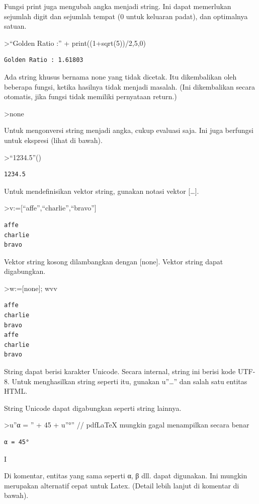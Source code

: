 \documentclass[
]{book}
\begin{document}
Fungsi print juga mengubah angka menjadi string. Ini dapat memerlukan sejumlah digit dan sejumlah tempat (0 untuk keluaran padat), dan optimalnya satuan.

\textgreater{}``Golden Ratio :'' + print((1+sqrt(5))/2,5,0)

\begin{verbatim}
Golden Ratio : 1.61803
\end{verbatim}

Ada string khusus bernama none yang tidak dicetak. Itu dikembalikan oleh beberapa fungsi, ketika hasilnya tidak menjadi masalah. (Ini dikembalikan secara otomatis, jika fungsi tidak memiliki pernyataan return.)

\textgreater none

Untuk mengonversi string menjadi angka, cukup evaluasi saja. Ini juga berfungsi untuk ekspresi (lihat di bawah).

\textgreater{}``1234.5''()

\begin{verbatim}
1234.5
\end{verbatim}

Untuk mendefinisikan vektor string, gunakan notasi vektor {[}\ldots{]}.

\textgreater v:={[}``affe'',``charlie'',``bravo''{]}

\begin{verbatim}
affe
charlie
bravo
\end{verbatim}

Vektor string kosong dilambangkan dengan {[}none{]}. Vektor string dapat digabungkan.

\textgreater w:={[}none{]}; w\textbar v\textbar v

\begin{verbatim}
affe
charlie
bravo
affe
charlie
bravo
\end{verbatim}

String dapat berisi karakter Unicode. Secara internal, string ini berisi kode UTF-8. Untuk menghasilkan string seperti itu, gunakan u''\ldots'' dan salah satu entitas HTML.

String Unicode dapat digabungkan seperti string lainnya.

\textgreater u''α = '' + 45 + u''°'' // pdfLaTeX mungkin gagal menampilkan secara benar

\begin{verbatim}
α = 45°
\end{verbatim}

I

Di komentar, entitas yang sama seperti α, β dll. dapat digunakan. Ini mungkin merupakan alternatif cepat untuk Latex. (Detail lebih lanjut di komentar di bawah).
\end{document}
